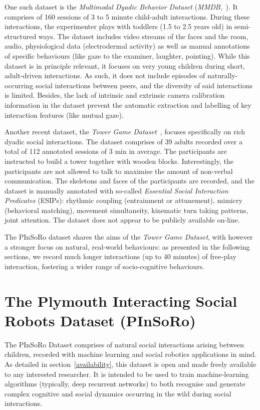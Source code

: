 \documentclass{article}
\begin{document}
One such dataset is the \emph{Multimodal Dyadic Behavior Dataset}
(\emph{MMDB},~\cite{rehg2013decoding}). It comprises of 160 sessions of 3 to 5
minute child-adult interactions. During these interactions, the experimenter
plays with toddlers (1.5 to 2.5 years old) in semi-structured ways.  The dataset
includes video streams of the faces and the room, audio, physiological data
(electrodermal activity) as well as manual annotations of specific behaviours
(like gaze to the examiner, laughter, pointing). While this dataset is in
principle relevant, it focuses on very young children during short, adult-driven
interactions. As such, it does not include episodes of naturally-occurring
social interactions between peers, and the diversity of said interactions is
limited. Besides, the lack of intrinsic and extrinsic camera calibration
information in the dataset prevent the automatic extraction and labelling of key
interaction features (like mutual gaze).

Another recent dataset, the \emph{Tower Game Dataset}~\cite{salter2015tower},
focuses specifically on rich dyadic social interactions. The dataset comprises
of 39 adults recorded over a total of 112 annotated sessions of 3 min in
average. The participants are instructed to build a tower together with wooden
blocks. Interestingly, the participants are not allowed to talk to
maximise the amount of non-verbal communication. The skeletons and faces of the
participants are recorded, and the dataset is manually annotated with so-called
\emph{Essential Social Interaction Predicates} (ESIPs): rhythmic coupling
(entrainment or attunement), mimicry (behavioral matching), movement
simultaneity, kinematic turn taking patterns, joint attention. The dataset does
not appear to be publicly available on-line.

The PInSoRo dataset shares the aims of the \emph{Tower Game Dataset}, with
however a stronger focus on natural, real-world behaviours: as presented in the
following sections, we record much longer interactions (up to 40 minutes) of
free-play interaction, fostering a wider range of socio-cognitive behaviours.

\section{The Plymouth Interacting Social Robots Dataset (PInSoRo)}

The PInSoRo Dataset comprises of natural
social interactions arising between children, recorded with machine learning
and social robotics applications in mind. 
As detailed in section~\ref{availability}, this dataset is open and made freely
available to any interested researcher. It is intended to be used to train
machine-learning algorithms (typically, deep recurrent networks) to both
recognise and generate complex cognitive and social dynamics occurring in the
wild during social interactions.
\end{document}
